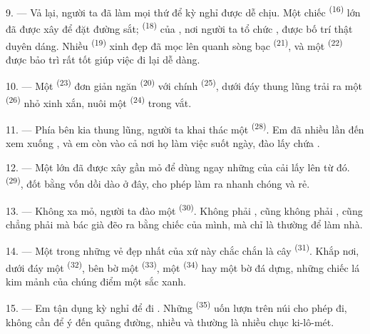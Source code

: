 \VUsaut{3.0mm}
\VUsaut{3.0mm}

9. --- Vả lại, người ta đã làm mọi thứ để kỳ nghỉ được dễ chịu. Một chiếc  \textsuperscript{(16)} lớn đã được xây để đặt đường sắt; 
\textsuperscript{(18)} của , nơi người ta tổ chức
, được bố trí thật duyên dáng. Nhiều 
\textsuperscript{(19)} xinh đẹp đã mọc lên quanh sòng bạc \textsuperscript{(21)}, và một
 \textsuperscript{(22)} được bảo trì rất tốt giúp việc đi lại dễ
dàng.

10. --- Một  \textsuperscript{(23)} đơn giản ngăn 
\textsuperscript{(20)} với chính  \textsuperscript{(25)}, dưới đáy
thung lũng trải ra một  \textsuperscript{(26)} nhỏ xinh xắn, nuôi một
 \textsuperscript{(24)} trong vắt.

11. --- Phía bên kia thung lũng, người ta khai thác một 
\textsuperscript{(28)}. Em đã nhiều lần đến xem  xuống , và em còn vào cả  nơi họ làm việc suốt ngày, đào lấy
 chứa .

12. --- Một  lớn đã được xây gần mỏ để dùng ngay những của cải
lấy lên từ đó.  \textsuperscript{(29)}, đốt bằng  vốn dồi
dào ở đây, cho phép làm ra  nhanh chóng và rẻ.

13. --- Không xa mỏ, người ta đào một  \textsuperscript{(30)}. Không phải
, cũng không phải , cũng chẳng phải  mà bác  già đẽo ra bằng chiếc  của mình, mà chỉ
là  thường để làm nhà.

14. --- Một trong những vẻ đẹp nhất của xứ này chắc chắn là cây 
\textsuperscript{(31)}. Khắp nơi, dưới đáy một  \textsuperscript{(32)},
bên bờ một  \textsuperscript{(33)}, một 
\textsuperscript{(34)} hay một bờ đá dựng, những chiếc lá kim mảnh của chúng điểm một
sắc xanh.

\VUsaut{3.0mm}
\VUsaut{3.0mm}

15. --- Em tận dụng kỳ nghỉ để đi . Những 
\textsuperscript{(35)} uốn lượn trên núi cho phép đi, không cần để ý đến quãng đường,
nhiều  và thường là nhiều chục ki-lô-mét.

